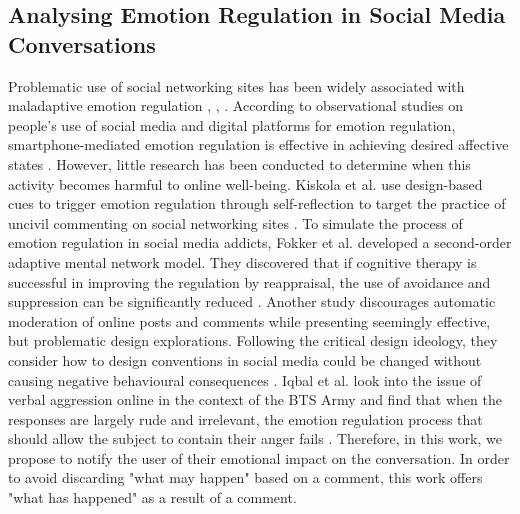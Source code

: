 \subsection{Analysing Emotion Regulation in Social Media Conversations}
Problematic use of social networking sites has been widely associated with maladaptive emotion regulation \cite{yang2020social}, \cite{zsido2021role}, \cite{liu2019adult}. According to observational studies on people's use of social media and digital platforms for emotion regulation, smartphone-mediated emotion regulation is effective in achieving desired affective states \cite{shi2023instant}. However, little research has been conducted to determine when this activity becomes harmful to online well-being. Kiskola et al. use design-based cues to trigger emotion regulation through self-reflection to target the practice of uncivil commenting on social networking sites \cite{kiskola2021applying}. To simulate the process of emotion regulation in social media addicts, Fokker et al. developed a second-order adaptive mental network model. They discovered that if cognitive therapy is successful in improving the regulation by reappraisal, the use of avoidance and suppression can be significantly reduced \cite{fokker2021second}. Another study discourages automatic moderation of online posts and comments while presenting seemingly effective, but problematic design explorations. Following the critical design ideology, they consider how to design conventions in social media could be changed without causing negative behavioural consequences \cite{loizides2020human}. Iqbal et al. look into the issue of verbal aggression online in the context of the BTS Army and find that when the responses are largely rude and irrelevant, the emotion regulation process that should allow the subject to contain their anger fails \cite{iqbal2022emotion}. Therefore, in this work, we propose to notify the user of their emotional impact on the conversation. In order to avoid discarding "what may happen" based on a comment, this work offers "what has happened" as a result of a comment.

